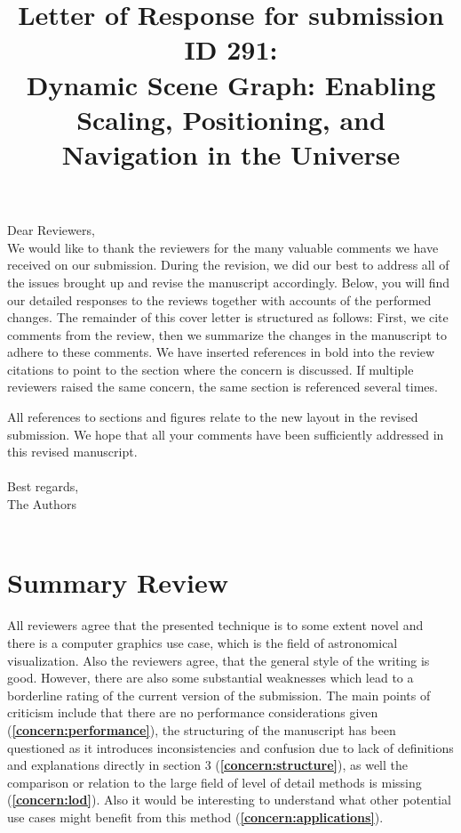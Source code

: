 \documentclass{article}
\let\oldref\ref
\renewcommand{\ref}[1]{(\textbf{\oldref{#1}})}
\begin{document}
\title{Letter of Response for submission ID 291: \\Dynamic Scene Graph: Enabling Scaling, Positioning, and Navigation in the Universe}
\maketitle

Dear Reviewers, \\

We would like to thank the reviewers for the many valuable comments we have received on
our submission.
During the revision, we did our best to address all of the issues brought up and revise the manuscript accordingly.
Below, you will find our detailed responses to the reviews together with accounts of the performed changes.
The remainder of this cover letter is structured as follows:
First, we cite comments from the review, then we summarize the changes in the manuscript to adhere to these comments.
We have inserted references in bold into the review citations to point to the section where the concern is discussed.
If multiple reviewers raised the same concern, the same section is referenced several times.

All references to sections and figures relate to the new layout in the revised submission. We hope that all your comments have been sufficiently addressed in this revised manuscript. \\\\

Best regards, \\
The Authors \\\\

\section*{Summary Review}

All reviewers agree that the presented technique is to some extent novel and there is a computer graphics use case, which is the field of astronomical visualization.
Also the reviewers agree, that the general style of the writing is good.
However, there are also some substantial weaknesses which lead to a borderline rating of the current version of the submission.
The main points of criticism include that there are no performance considerations given \ref{concern:performance}, the structuring of the manuscript has been questioned as it introduces inconsistencies and confusion due to lack of definitions and explanations directly in section 3 \ref{concern:structure}, as well the comparison or relation to the large field of level of detail methods is missing \ref{concern:lod}.
Also it would be interesting to understand what other potential use cases might benefit from this method \ref{concern:applications}.
\end{document}
